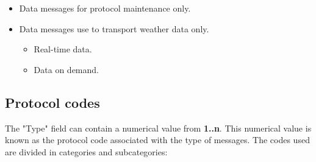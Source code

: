 \begin{itemize}
\item Data messages for protocol maintenance only.
\item Data messages use to transport weather data only.
	\begin{itemize}
		\item Real-time data.
		\item Data on demand.
	\end{itemize}
\end{itemize}

\subsection{Protocol codes}

The "Type" field can contain a numerical value from \textbf{1..n}. This numerical value is known as the protocol code associated with the type of messages. The codes used are divided in categories and subcategories:

